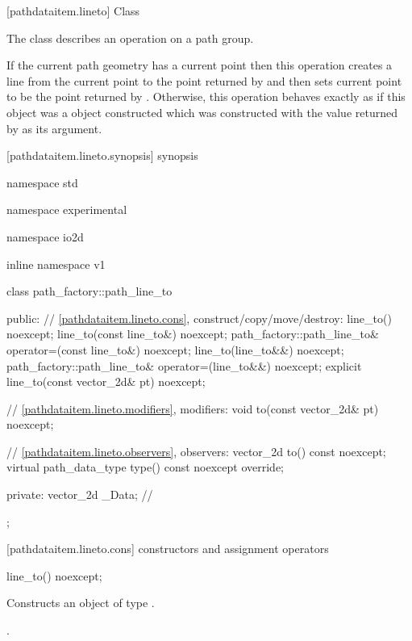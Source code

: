  [pathdataitem.lineto] {Class }

\pnum
{}
The class  describes an operation on a path group.

\pnum
If the current path geometry has a current point then this operation creates a line from the current point to the point returned by  and then sets current point to be the point returned by . Otherwise, this operation behaves exactly as if this object was a  object constructed which was constructed with the value returned by  as its argument.

 [pathdataitem.lineto.synopsis] { synopsis}

\begin{codeblock}
namespace std { namespace experimental { namespace io2d { inline namespace v1 {
  class path_factory::path_line_to {
  public:
    // \ref{pathdataitem.lineto.cons}, construct/copy/move/destroy:
    line_to() noexcept;
    line_to(const line_to&) noexcept;
    path_factory::path_line_to& operator=(const line_to&) noexcept;
    line_to(line_to&&) noexcept;
    path_factory::path_line_to& operator=(line_to&&) noexcept;
    explicit line_to(const vector_2d& pt) noexcept;

    // \ref{pathdataitem.lineto.modifiers}, modifiers:
    void to(const vector_2d& pt) noexcept;

    // \ref{pathdataitem.lineto.observers}, observers:
    vector_2d to() const noexcept;
    virtual path_data_type type() const noexcept override;
    
  private:
    vector_2d _Data; // \expos
  };
} } } }
\end{codeblock}

 [pathdataitem.lineto.cons] { constructors and assignment operators}

\begin{itemdecl}
    line_to() noexcept;
\end{itemdecl}
\begin{itemdescr}
	\pnum
	\effects
	Constructs an object of type .
	
	\pnum
	\postconditions
	.
\end{itemdescr}

